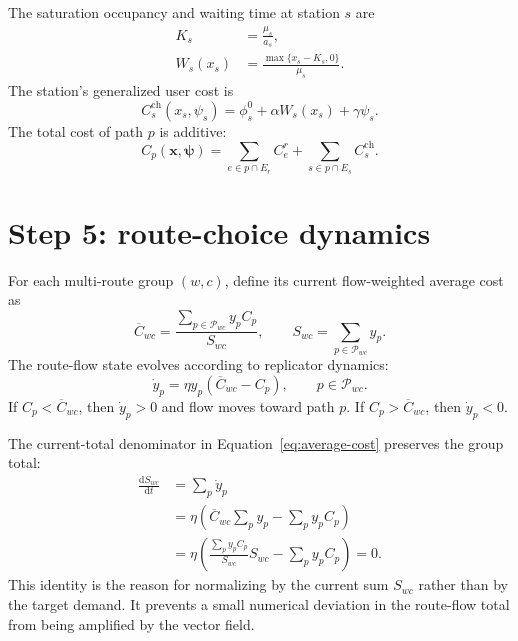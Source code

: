 \documentclass[11pt]{article}
\newcommand{\dd}{\mathrm{d}}
\begin{document}
The saturation occupancy and waiting time at station $s$ are
\begin{align}
    K_s &= \frac{\mu_s}{a_s},\\
    W_s(x_s)&=\frac{\max\{x_s-K_s,0\}}{\mu_s}.
\end{align}
The station's generalized user cost is
\begin{equation}
    C_s^{\mathrm{ch}}(x_s,\psi_s)
    =\phi_s^0+\alpha W_s(x_s)+\gamma\psi_s.
    \label{eq:station-cost}
\end{equation}
The total cost of path $p$ is additive:
\begin{equation}
    C_p(\mathbf x,\boldsymbol\psi)
    =\sum_{e\in p\cap E_r}C_e^r
    +\sum_{s\in p\cap E_s}C_s^{\mathrm{ch}}.
    \label{eq:path-cost}
\end{equation}

\section{Step 5: route-choice dynamics}

For each multi-route group $(w,c)$, define its current flow-weighted average
cost as
\begin{equation}
    \overline C_{wc}
    =\frac{\sum_{p\in\mathcal P_{wc}}y_pC_p}
    {S_{wc}},
    \qquad S_{wc}=\sum_{p\in\mathcal P_{wc}}y_p.
    \label{eq:average-cost}
\end{equation}
The route-flow state evolves according to replicator dynamics:
\begin{equation}
    \dot y_p
    =\eta y_p\left(\overline C_{wc}-C_p\right),
    \qquad p\in\mathcal P_{wc}.
    \label{eq:replicator}
\end{equation}
If $C_p<\overline C_{wc}$, then $\dot y_p>0$ and flow moves toward path $p$.
If $C_p>\overline C_{wc}$, then $\dot y_p<0$.

The current-total denominator in Equation~\eqref{eq:average-cost} preserves
the group total:
\begin{align}
    \frac{\dd S_{wc}}{\dd t}
    &=\sum_p\dot y_p\\
    &=\eta\left(
       \overline C_{wc}\sum_p y_p-\sum_p y_pC_p
      \right)\\
    &=\eta\left(
       \frac{\sum_p y_pC_p}{S_{wc}}S_{wc}-\sum_p y_pC_p
      \right)=0.
\end{align}
This identity is the reason for normalizing by the current sum $S_{wc}$ rather
than by the target demand. It prevents a small numerical deviation in the
route-flow total from being amplified by the vector field.
\end{document}
